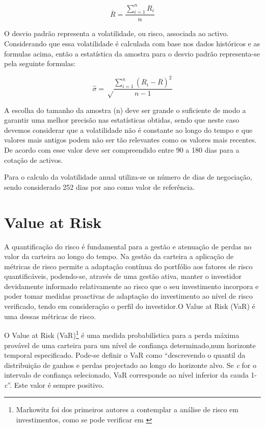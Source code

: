\documentclass[
  12pt,
  a4paper,
  openany]{book}
\begin{document}
\begin{equation} 
  \overline{R} = \frac{\displaystyle\sum_{i=1}^n R_i}{n}
  \label{eq:meanRet}
\end{equation}

O desvio padrão representa a volatilidade, ou risco, associada ao activo. Considerando que essa volatilidade é calculada com base nos dados históricos e as formulas acima, então a estatística da amostra para o desvio padrão representa-se pela seguinte formulas:

\begin{equation} 
  \hat{\sigma} = \sqrt\frac{\displaystyle\sum_{i=1}^n (R_i-\overline{R})^2}{n-1}
  \label{eq:estdesviopadrao}
\end{equation}

A escolha do tamanho da amostra (n) deve ser grande o suficiente de modo a garantir uma melhor precisão nas estatísticas obtidas, sendo que neste caso devemos considerar que a volatilidade não é constante ao longo do tempo e que valores mais antigos podem não ser tão relevantes como os valores mais recentes. De acordo com \citep{Hull2018} esse valor deve ser compreendido entre 90 a 180 dias para a cotação de activos.

Para o calculo da volatilidade anual utiliza-se os número de dias de negociação, sendo considerado 252 dias por ano como valor de referência.

\hypertarget{value-at-risk}{%
\section{Value at Risk}\label{value-at-risk}}

A quantificação do risco é fundamental para a gestão e atenuação de perdas no valor da carteira ao longo do tempo. Na gestão da carteira a aplicação de métricas de risco permite a adaptação contínua do portfólio aos fatores de risco quantificáveis, podendo-se, através de uma gestão ativa, manter o investidor devidamente informado relativamente ao risco que o seu investimento incorpora e poder tomar medidas proactivas de adaptação do investimento ao nível de risco verificado, tendo em consideração o perfil do investidor.O Value at Risk (VaR) é uma dessas métricas de risco.

O Value at Risk (VaR)\footnote{Markowitz foi dos primeiros autores a contemplar a análise de risco em investimentos, como se pode verificar em \citet{Markowitz1952}} é uma medida probabilística para a perda máxima provável de uma carteira para um nível de confiança determinado,num horizonte temporal especificado. Pode-se definir o VaR como ``descrevendo o quantil da distribuição de ganhos e perdas projectado ao longo do horizonte alvo. Se \emph{c} for o intervalo de confiança selecionado, VaR corresponde ao nível inferior da cauda 1-\emph{c}''\citep[pp.17]{philippe}. Este valor é sempre positivo.
\end{document}
